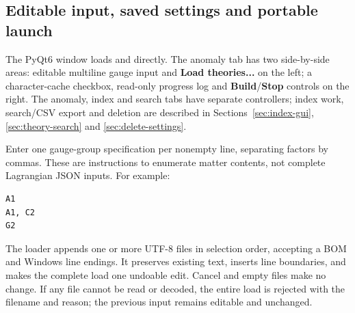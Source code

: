 \subsection{Editable input, saved settings and portable launch}
The PyQt6 window loads  and  directly.
The anomaly tab has two side-by-side areas: editable multiline gauge input and
\textbf{Load theories...} on the left; a character-cache checkbox, read-only
progress log and \textbf{Build}/\textbf{Stop} controls on the right. The anomaly,
index and search tabs have separate controllers; index work, search/CSV export
and deletion are described in Sections~\ref{sec:index-gui},
\ref{sec:theory-search} and \ref{sec:delete-settings}.

Enter one gauge-group specification per nonempty line, separating factors by
commas. These are instructions to enumerate matter contents, not complete
Lagrangian JSON inputs. For example:
\begin{lstlisting}
A1
A1, C2
G2
\end{lstlisting}
The loader appends one or more UTF-8 files in selection order, accepting a BOM
and Windows line endings. It preserves existing text, inserts line boundaries,
and makes the complete load one undoable edit. Cancel and empty files make no
change. If any file cannot be read or decoded, the entire load is rejected with
the filename and reason; the previous input remains editable and unchanged.

